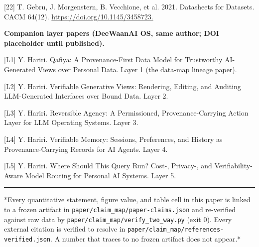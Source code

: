 \documentclass[11pt,a4paper]{article}
\begin{document}
[22] T. Gebru, J. Morgenstern, B. Vecchione, et al. 2021. Datasheets for Datasets. CACM 64(12). \url{https://doi.org/10.1145/3458723.}

\textbf{Companion layer papers (DeeWaanAI OS, same author; DOI placeholder until published).}

[L1] Y. Hariri. Qafiya: A Provenance-First Data Model for Trustworthy AI-Generated Views over Personal Data. Layer 1 (the data-map lineage paper).

[L2] Y. Hariri. Verifiable Generative Views: Rendering, Editing, and Auditing LLM-Generated Interfaces over Bound Data. Layer 2.

[L3] Y. Hariri. Reversible Agency: A Permissioned, Provenance-Carrying Action Layer for LLM Operating Systems. Layer 3.

[L4] Y. Hariri. Verifiable Memory: Sessions, Preferences, and History as Provenance-Carrying Records for AI Agents. Layer 4.

[L5] Y. Hariri. Where Should This Query Run? Cost-, Privacy-, and Verifiability-Aware Model Routing for Personal AI Systems. Layer 5.

\vspace{4pt}\noindent\rule{\linewidth}{0.4pt}\vspace{4pt}
*Every quantitative statement, figure value, and table cell in this paper is linked to a frozen artifact in \texttt{paper/claim\_map/paper-claims.json} and re-verified against raw data by \texttt{paper/claim\_map/verify\_two\_way.py} (exit 0). Every external citation is verified to resolve in \texttt{paper/claim\_map/references-verified.json}. A number that traces to no frozen artifact does not appear.*
\end{document}
